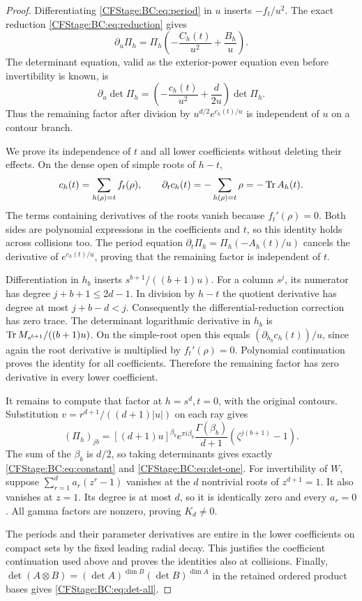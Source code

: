 \begin{proof}
Differentiating \eqref{CFStage:BC:eq:period} in $u$ inserts $-f_t/u^2$.
The exact reduction \eqref{CFStage:BC:eq:reduction} gives
\[
 \partial_u\Pi_h=\Pi_h\left(-\frac{C_h(t)}{u^2}
                                    +\frac{B_h}u\right).
\]
The determinant equation, valid as the exterior-power equation even
before invertibility is known, is
\begin{equation}
 \partial_u\det\Pi_h=
     \left(-\frac{c_h(t)}{u^2}+\frac d{2u}\right)\det\Pi_h.
 \label{CFStage:BC:eq:det-ode}
\end{equation}
Thus the remaining factor after division by $u^{d/2}e^{c_h(t)/u}$
is independent of $u$ on a contour branch.

We prove its independence of $t$ and all lower coefficients without
deleting their effects.  On the dense open of simple roots of $h-t$,
\[
 c_h(t)=\sum_{h(\rho)=t}f_t(\rho),\qquad
 \partial_t c_h(t)=-\sum_{h(\rho)=t}\rho=-\operatorname{Tr} A_h(t).
\]
The terms containing derivatives of the roots vanish because
$f_t'(\rho)=0$.  Both sides are polynomial expressions in the
coefficients and $t$, so this identity holds across collisions too.
The period equation
$\partial_t\Pi_h=\Pi_h(-A_h(t)/u)$ cancels the derivative of
$e^{c_h(t)/u}$, proving that the remaining factor is independent of $t$.

Differentiation in $h_b$ inserts $s^{b+1}/((b+1)u)$.  For a column
$s^j$, its numerator has degree $j+b+1\le2d-1$.
In division by $h-t$ the quotient derivative has degree at most
$j+b-d<j$.  Consequently the differential-reduction correction has
zero trace.  The determinant logarithmic derivative in $h_b$ is
$\operatorname{Tr} M_{s^{b+1}}/((b+1)u)$.  On the simple-root open this equals
$(\partial_{h_b}c_h(t))/u$, since again the root derivative is multiplied
by $f_t'(\rho)=0$.  Polynomial continuation proves the identity for all
coefficients.  Therefore the remaining factor has zero derivative in
every lower coefficient.

It remains to compute that factor at $h=s^d,t=0$, with the original
contours.  Substitution $v=r^{d+1}/((d+1)|u|)$ on each ray gives
\begin{equation}
 (\Pi_h)_{jb}
  =[(d+1)u]^{\beta_b}e^{\pi i\beta_b}
        \frac{\Gamma(\beta_b)}{d+1}
             (\zeta^{j(b+1)}-1).
 \label{CFStage:BC:eq:gamma-columns}
\end{equation}
The sum of the $\beta_b$ is $d/2$, so taking determinants gives
exactly \eqref{CFStage:BC:eq:constant} and \eqref{CFStage:BC:eq:det-one}.
For invertibility of $W$, suppose
$\sum_{r=1}^d a_r(z^r-1)$ vanishes at the $d$ nontrivial roots of
$z^{d+1}=1$.  It also vanishes at $z=1$.  Its degree is at most $d$,
so it is identically zero and every $a_r=0$.  All gamma factors are
nonzero, proving $K_d\ne0$.

The periods and their parameter derivatives are entire in the lower
coefficients on compact sets by the fixed leading radial decay.
This justifies the coefficient continuation used above and proves the
identities also at collisions.  Finally,
$\det(A\otimes B)=(\det A)^{\dim B}(\det B)^{\dim A}$ in the
retained ordered product bases gives \eqref{CFStage:BC:eq:det-all}.
\end{proof}

